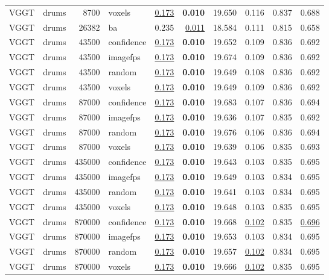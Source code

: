 \begin{table}[H]
\begin{tabular}{llrlrrrrrr}
VGGT & drums & 8700 & voxels & \underline{0.173} & \textbf{0.010} & 19.650 & 0.116 & 0.837 & 0.688 \\
VGGT & drums & 26382 & ba & 0.235 & \underline{0.011} & 18.584 & 0.111 & 0.815 & 0.658 \\
VGGT & drums & 43500 & confidence & \underline{0.173} & \textbf{0.010} & 19.652 & 0.109 & 0.836 & 0.692 \\
VGGT & drums & 43500 & imagefps & \underline{0.173} & \textbf{0.010} & 19.674 & 0.109 & 0.836 & 0.692 \\
VGGT & drums & 43500 & random & \underline{0.173} & \textbf{0.010} & 19.649 & 0.108 & 0.836 & 0.692 \\
VGGT & drums & 43500 & voxels & \underline{0.173} & \textbf{0.010} & 19.649 & 0.109 & 0.836 & 0.692 \\
VGGT & drums & 87000 & confidence & \underline{0.173} & \textbf{0.010} & 19.683 & 0.107 & 0.836 & 0.694 \\
VGGT & drums & 87000 & imagefps & \underline{0.173} & \textbf{0.010} & 19.636 & 0.107 & 0.835 & 0.692 \\
VGGT & drums & 87000 & random & \underline{0.173} & \textbf{0.010} & 19.676 & 0.106 & 0.836 & 0.694 \\
VGGT & drums & 87000 & voxels & \underline{0.173} & \textbf{0.010} & 19.639 & 0.106 & 0.835 & 0.693 \\
VGGT & drums & 435000 & confidence & \underline{0.173} & \textbf{0.010} & 19.643 & 0.103 & 0.835 & 0.695 \\
VGGT & drums & 435000 & imagefps & \underline{0.173} & \textbf{0.010} & 19.649 & 0.103 & 0.834 & 0.695 \\
VGGT & drums & 435000 & random & \underline{0.173} & \textbf{0.010} & 19.641 & 0.103 & 0.834 & 0.695 \\
VGGT & drums & 435000 & voxels & \underline{0.173} & \textbf{0.010} & 19.648 & 0.103 & 0.835 & 0.695 \\
VGGT & drums & 870000 & confidence & \underline{0.173} & \textbf{0.010} & 19.668 & \underline{0.102} & 0.835 & \underline{0.696} \\
VGGT & drums & 870000 & imagefps & \underline{0.173} & \textbf{0.010} & 19.653 & 0.103 & 0.834 & 0.695 \\
VGGT & drums & 870000 & random & \underline{0.173} & \textbf{0.010} & 19.657 & \underline{0.102} & 0.834 & 0.695 \\
VGGT & drums & 870000 & voxels & \underline{0.173} & \textbf{0.010} & 19.666 & \underline{0.102} & 0.835 & 0.695 \\
\bottomrule
\end{tabular}
\end{table}
